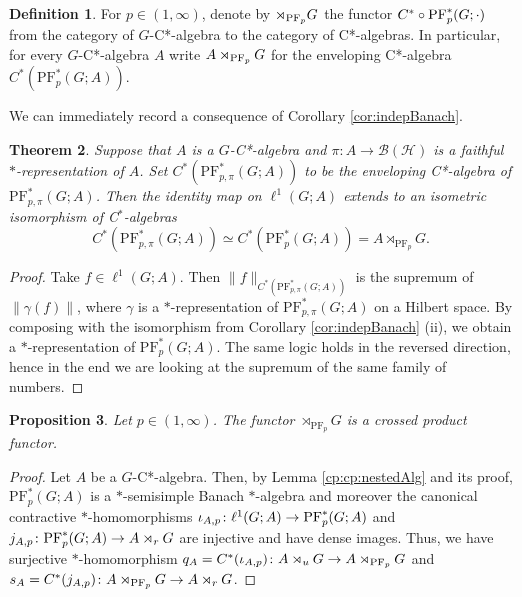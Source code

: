 \documentclass[12pt]{amsart}
\newtheorem{thm}{Theorem}[section]
\newtheorem{prop}[thm]{Proposition}
\theoremstyle{definition}
\newtheorem{defn}[thm]{Definition}
\theoremstyle{remark}
\numberwithin{equation}{section}
\newcommand{\mc}{\mathcal}
\newcommand{\PF}[3]{\ensuremath{\mathrm{PF}_{#1}^*\left(#2; #3\right)}}
\begin{document}
\begin{defn}
   For $p\in (1,\infty)$, denote by $\rtimes_{\textup{PF}_p} G$  the functor $C^* \circ \textup{PF}^*_p(G;\cdot)$
	from the category of $G$-C*-algebra to the category of C*-algebras. In particular, for every $G$-C*-algebra $A$ write
$A\rtimes_{\textup{PF}_p} G$ for the enveloping C*-algebra 	$C^*(\PF{p}{G}{A})$.
\end{defn}


We can immediately record a consequence of Corollary \ref{cor:indepBanach}.

\begin{thm}\label{T:C* envlope PF cross product}
	Suppose that $A$ is a $G$-C*-algebra and $\pi\colon A \to \mc{B}(\mc{H})$ is a faithful $*$-representation of $A$. Set $C^*(\PF{p,\pi}{G}{A})$ to be the enveloping C*-algebra of $\PF{p,\pi}{G}{A}$. Then
	 the identity map on $\ell^1(G;A)$ extends to an isometric isomorphism of C$^*$-algebras
	\[
	C^*(\PF{p,\pi}{G}{A})\simeq
	C^*(\PF{p}{G}{A})=A\rtimes_{\mathrm{PF}_p} G.\]
\end{thm}
\begin{proof} Take $f\in \ell^1(G;A)$. Then $\|f\|_{C^*(\PF{p,\pi}{G}{A})}$ is the supremum of $\|\gamma(f)\|$, where $\gamma$ is a $*$-representation of $\PF{p,\pi}{G}{A}$ on a Hilbert space. By composing with the isomorphism from Corollary \ref{cor:indepBanach} (ii), we obtain a $*$-representation of $\PF{p}{G}{A}$. The same logic holds in the reversed direction, hence in the end we are looking at the supremum of the same family of numbers.
	\end{proof}

\begin{prop}
Let $p \in (1, \infty)$. The functor $\rtimes_{\mathrm{PF}_p} G$ is a crossed product functor.
\end{prop}

\begin{proof}
	Let $A$ be a $G$-C*-algebra. Then, by Lemma \ref{cp:cp:nestedAlg} and its proof, $\PF{p}{G}{A}$ is a $*$-semisimple Banach $*$-algebra and moreover the canonical contractive $*$-homomorphisms $\iota_{A,p}\colon \ell^1(G;A) \to \textup{PF}_p^*(G;A)$ and
	$j_{A,p}\colon \textup{PF}_p^*(G;A) \to A\rtimes_r G$  are injective and 	
	have dense images. Thus, we have surjective $*$-homomorphism
	$q_A = C^*(\iota_{A,p})\colon A\rtimes_{u} G \to A\rtimes_{\textup{PF}_p}G$ and
	$s_A = C^*(j_{A,p})\colon A\rtimes_{\textup{PF}_p}G \to A\rtimes_r G$.
\end{proof}
\end{document}
